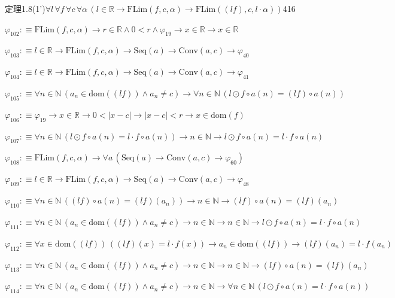 \begin{fullproof}{定理1.8(1')}{$\forall l\,\forall f\,\forall c\,\forall \alpha\,(l \in \mathbb{R} \to \mathrm{FLim}(f,c,\alpha) \to \mathrm{FLim}((l f),c,l \cdot \alpha))$}{416}
\begin{abbrevlist}
\item $\varphi_{102} :\equiv \mathrm{FLim}(f,c,\alpha) \to r \in \mathbb{R} \land 0 < r \land \varphi_{19} \to x \in \mathbb{R} \to x \in \mathbb{R}$
\item $\varphi_{103} :\equiv l \in \mathbb{R} \to \mathrm{FLim}(f,c,\alpha) \to \mathrm{Seq}(a) \to \mathrm{Conv}(a,c) \to \varphi_{40}$
\item $\varphi_{104} :\equiv l \in \mathbb{R} \to \mathrm{FLim}(f,c,\alpha) \to \mathrm{Seq}(a) \to \mathrm{Conv}(a,c) \to \varphi_{41}$
\item $\varphi_{105} :\equiv \forall n \in \mathbb{N}\,(a_{n} \in \mathrm{dom}((l f)) \land a_{n} \neq c) \to \forall n \in \mathbb{N}\,(l \odot f \circ a(n) = (l f) \circ a(n))$
\item $\varphi_{106} :\equiv \varphi_{19} \to x \in \mathbb{R} \to 0 < \lvert x - c \rvert \to \lvert x - c \rvert < r \to x \in \mathrm{dom}(f)$
\item $\varphi_{107} :\equiv \forall n \in \mathbb{N}\,(l \odot f \circ a(n) = l \cdot f \circ a(n)) \to n \in \mathbb{N} \to l \odot f \circ a(n) = l \cdot f \circ a(n)$
\item $\varphi_{108} :\equiv \mathrm{FLim}(f,c,\alpha) \to \forall a\,(\mathrm{Seq}(a) \to \mathrm{Conv}(a,c) \to \varphi_{60})$
\item $\varphi_{109} :\equiv l \in \mathbb{R} \to \mathrm{FLim}(f,c,\alpha) \to \mathrm{Seq}(a) \to \mathrm{Conv}(a,c) \to \varphi_{48}$
\item $\varphi_{110} :\equiv \forall n \in \mathbb{N}\,((l f) \circ a(n) = (l f)(a_{n})) \to n \in \mathbb{N} \to (l f) \circ a(n) = (l f)(a_{n})$
\item $\varphi_{111} :\equiv \forall n \in \mathbb{N}\,(a_{n} \in \mathrm{dom}((l f)) \land a_{n} \neq c) \to n \in \mathbb{N} \to n \in \mathbb{N} \to l \odot f \circ a(n) = l \cdot f \circ a(n)$
\item $\varphi_{112} :\equiv \forall x \in \mathrm{dom}((l f))\,((l f)(x) = l \cdot f(x)) \to a_{n} \in \mathrm{dom}((l f)) \to (l f)(a_{n}) = l \cdot f(a_{n})$
\item $\varphi_{113} :\equiv \forall n \in \mathbb{N}\,(a_{n} \in \mathrm{dom}((l f)) \land a_{n} \neq c) \to n \in \mathbb{N} \to n \in \mathbb{N} \to (l f) \circ a(n) = (l f)(a_{n})$
\item $\varphi_{114} :\equiv \forall n \in \mathbb{N}\,(a_{n} \in \mathrm{dom}((l f)) \land a_{n} \neq c) \to n \in \mathbb{N} \to \forall n \in \mathbb{N}\,(l \odot f \circ a(n) = l \cdot f \circ a(n))$

\end{abbrevlist}
\end{fullproof}
